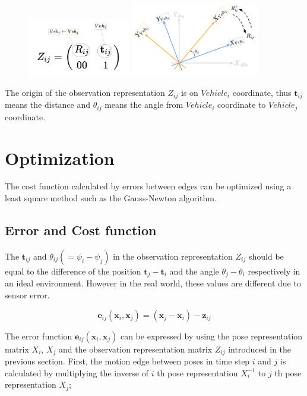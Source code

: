 \documentclass{article}
\begin{document}
\begin{figure}[h!]
  \centering
  \includegraphics[width=0.4\textwidth]{2-5_observation_representation_matrix.png}
  \includegraphics[width=0.5\textwidth]{2-6_rotation_matrix.png}
\end{figure}

The origin of the observation representation $Z_{ij}$ is on $Vehicle_i$ coordinate, thus $\bm{t}_{ij}$ means the distance and $\theta_{ij}$ means the angle from $Vehicle_i$ coordinate to $Vehicle_j$ coordinate.

\newpage

\section{Optimization} \label{optimization}

The cost function calculated by errors between edges can be optimized using a least square method such as the Gauss-Newton algorithm.

\subsection{Error and Cost function}

The $\bm{t}_{ij}$ and $\theta_{ij} (= \psi_i - \psi_j)$ in the observation representation $Z_{ij}$ should be equal to the difference of the position $\bm{t}_j - \bm{t}_i$ and the angle $\theta_j - \theta_i$ respectively in an ideal environment.
However in the real world, these values are different due to sensor error.

\[
\bm{e}_{ij}(\bm{x}_i, \bm{x}_j) = (\bm{x}_j - \bm{x}_i) - \bm{z}_{ij}
\]

The error function $\bm{e}_{ij}(\bm{x}_i, \bm{x}_j)$ can be expressed by using the pose representation matrix $X_i$, $X_j$ and the observation representation matrix $Z_{ij}$ introduced in the previous section.
First, the motion edge between poses in time step $i$ and $j$ is calculated by multiplying the inverse of $i$ th pose representation $X_i^{-1}$ to $j$ th pose representation $X_j$;
\end{document}

